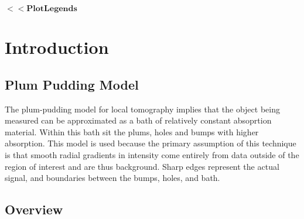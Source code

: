 






\noindent\(\pmb{<<\text{PlotLegends$\grave{ }$}}\)

\section*{Introduction}

\subsection*{Plum Pudding Model}

The plum-pudding model for local tomography implies that the object being measured can be approximated as a bath of relatively constant absoprtion material. Within this bath sit the plums, holes and bumps with higher absorption. This model is used because the primary assumption of this technique is that smooth radial gradients in intensity come entirely from data outside of the region of interest and are thus background. Sharp edges represent the actual signal, and boundaries between the bumps, holes, and bath.

\subsection*{Overview}

